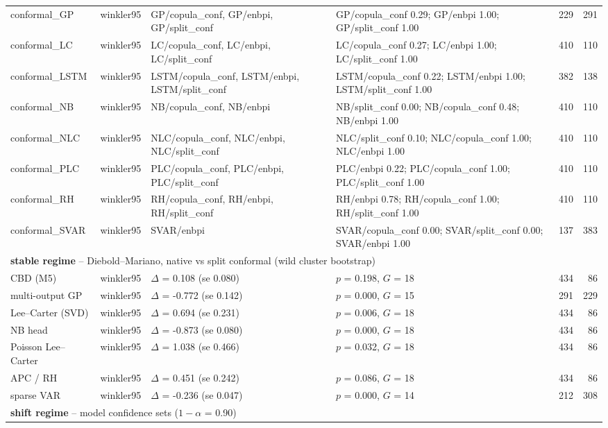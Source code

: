 {\begin{longtable}{@{}llp{3.2cm}p{5.2cm}rr@{}}
conformal\_GP & winkler95 & GP/copula\_conf, GP/enbpi, GP/split\_conf & GP/copula\_conf 0.29; GP/enbpi 1.00; GP/split\_conf 1.00 & 229 & 291 \\
conformal\_LC & winkler95 & LC/copula\_conf, LC/enbpi, LC/split\_conf & LC/copula\_conf 0.27; LC/enbpi 1.00; LC/split\_conf 1.00 & 410 & 110 \\
conformal\_LSTM & winkler95 & LSTM/copula\_conf, LSTM/enbpi, LSTM/split\_conf & LSTM/copula\_conf 0.22; LSTM/enbpi 1.00; LSTM/split\_conf 1.00 & 382 & 138 \\
conformal\_NB & winkler95 & NB/copula\_conf, NB/enbpi & NB/split\_conf 0.00; NB/copula\_conf 0.48; NB/enbpi 1.00 & 410 & 110 \\
conformal\_NLC & winkler95 & NLC/copula\_conf, NLC/enbpi, NLC/split\_conf & NLC/split\_conf 0.10; NLC/copula\_conf 1.00; NLC/enbpi 1.00 & 410 & 110 \\
conformal\_PLC & winkler95 & PLC/copula\_conf, PLC/enbpi, PLC/split\_conf & PLC/enbpi 0.22; PLC/copula\_conf 1.00; PLC/split\_conf 1.00 & 410 & 110 \\
conformal\_RH & winkler95 & RH/copula\_conf, RH/enbpi, RH/split\_conf & RH/enbpi 0.78; RH/copula\_conf 1.00; RH/split\_conf 1.00 & 410 & 110 \\
conformal\_SVAR & winkler95 & SVAR/enbpi & SVAR/copula\_conf 0.00; SVAR/split\_conf 0.00; SVAR/enbpi 1.00 & 137 & 383 \\
\multicolumn{6}{l}{\textbf{stable regime} -- Diebold--Mariano, native vs split conformal (wild cluster bootstrap)} \\
\midrule
CBD (M5) & winkler95 & $\Delta$ = 0.108 (se 0.080) & $p$ = 0.198, $G$ = 18 & 434 & 86 \\
multi-output GP & winkler95 & $\Delta$ = -0.772 (se 0.142) & $p$ = 0.000, $G$ = 15 & 291 & 229 \\
Lee--Carter (SVD) & winkler95 & $\Delta$ = 0.694 (se 0.231) & $p$ = 0.006, $G$ = 18 & 434 & 86 \\
NB head & winkler95 & $\Delta$ = -0.873 (se 0.080) & $p$ = 0.000, $G$ = 18 & 434 & 86 \\
Poisson Lee--Carter & winkler95 & $\Delta$ = 1.038 (se 0.466) & $p$ = 0.032, $G$ = 18 & 434 & 86 \\
APC / RH & winkler95 & $\Delta$ = 0.451 (se 0.242) & $p$ = 0.086, $G$ = 18 & 434 & 86 \\
sparse VAR & winkler95 & $\Delta$ = -0.236 (se 0.047) & $p$ = 0.000, $G$ = 14 & 212 & 308 \\
\multicolumn{6}{l}{\textbf{shift regime} -- model confidence sets ($1-\alpha$ = 0.90)} \\

\end{longtable}}
